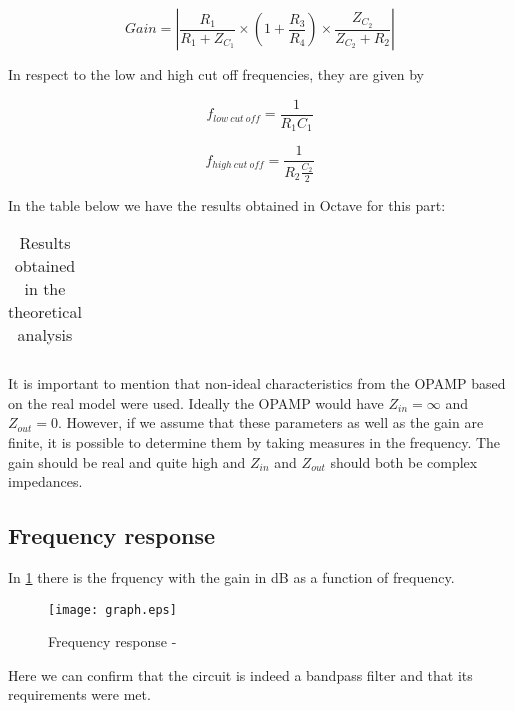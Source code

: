 \begin{equation}
Gain = \left| \frac{R_1}{R_1 + Z_{C_1}} \times  \left(1+\frac{R_3}{R_4}\right) \times \frac{Z_{C_2}}{Z_{C_2}+R_2} \right|
\end{equation}



In respect to the low and high cut off frequencies, they are given by 

\begin{equation}
f_{low \ cut \ off} = \frac{1}{R_1 C_1}
\end{equation}

\begin{equation}
f_{high \ cut \ off} = \frac{1}{R_2 \frac {C_2}{2}}
\end{equation}

In the table below we have the results obtained in Octave for this part:

\begin{table}[H]
  \centering
  \begin{tabular}{|c|c|}
    \hline
      
  \end{tabular}
  \caption{Results obtained in the theoretical analysis}
  \label{tab:results}
\end{table}

It is important to mention that non-ideal characteristics from the OPAMP based on the real model were used. Ideally the OPAMP would have $Z_{in} = \infty$ and $Z_{out} = 0$. However, if we assume that these parameters as well as the gain are finite, it is possible to determine them by taking measures in the frequency. The gain should be real and quite high and $Z_{in}$ and $Z_{out}$ should both be complex impedances.




\subsection{Frequency response}

In \ref{fig:freq_response} there is the frquency with the gain in dB as a function of frequency.


\begin{figure}[H] \centering
\texttt{[image: graph.eps]}
\caption{Frequency response - }
\label{fig:freq_response}
\end{figure}

Here we can confirm that the circuit is indeed a bandpass filter and that its requirements were met. 





